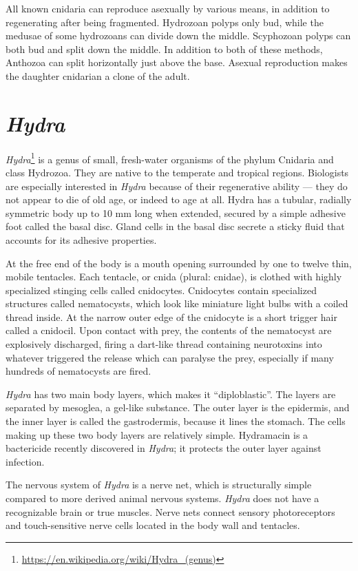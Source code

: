 \documentclass[]{book}
\let\rmarkdownfootnote\footnote%
\def\footnote{\protect\rmarkdownfootnote}
\renewcommand{\href}[2]{#2\footnote{\url{#1}}}
\theoremstyle{definition}
\theoremstyle{definition}
\theoremstyle{definition}
\theoremstyle{remark}
\begin{document}
All known cnidaria can reproduce asexually by various means, in addition
to regenerating after being fragmented. Hydrozoan polyps only bud, while
the medusae of some hydrozoans can divide down the middle. Scyphozoan
polyps can both bud and split down the middle. In addition to both of
these methods, Anthozoa can split horizontally just above the base.
Asexual reproduction makes the daughter cnidarian a clone of the adult.

\section{\texorpdfstring{\emph{Hydra}}{Hydra}}\label{hydra}

\href{https://en.wikipedia.org/wiki/Hydra_(genus)}{\emph{Hydra}} is a
genus of small, fresh-water organisms of the phylum Cnidaria and class
Hydrozoa. They are native to the temperate and tropical regions.
Biologists are especially interested in \emph{Hydra} because of their
regenerative ability --- they do not appear to die of old age, or indeed
to age at all. Hydra has a tubular, radially symmetric body up to 10 mm
long when extended, secured by a simple adhesive foot called the basal
disc. Gland cells in the basal disc secrete a sticky fluid that accounts
for its adhesive properties.

At the free end of the body is a mouth opening surrounded by one to
twelve thin, mobile tentacles. Each tentacle, or cnida (plural: cnidae),
is clothed with highly specialized stinging cells called cnidocytes.
Cnidocytes contain specialized structures called nematocysts, which look
like miniature light bulbs with a coiled thread inside. At the narrow
outer edge of the cnidocyte is a short trigger hair called a cnidocil.
Upon contact with prey, the contents of the nematocyst are explosively
discharged, firing a dart-like thread containing neurotoxins into
whatever triggered the release which can paralyse the prey, especially
if many hundreds of nematocysts are fired.

\emph{Hydra} has two main body layers, which makes it ``diploblastic''.
The layers are separated by mesoglea, a gel-like substance. The outer
layer is the epidermis, and the inner layer is called the gastrodermis,
because it lines the stomach. The cells making up these two body layers
are relatively simple. Hydramacin is a bactericide recently discovered
in \emph{Hydra}; it protects the outer layer against infection.

The nervous system of \emph{\emph{Hydra}} is a nerve net, which is structurally
simple compared to more derived animal nervous systems. \emph{Hydra}
does not have a recognizable brain or true muscles. Nerve nets connect
sensory photoreceptors and touch-sensitive nerve cells located in the
body wall and tentacles.
\end{document}

